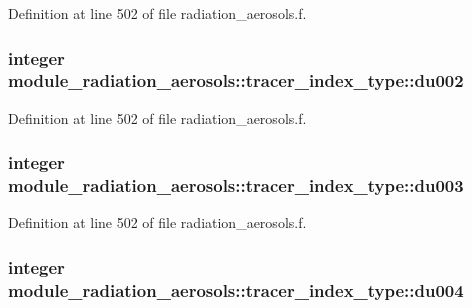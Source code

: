 Definition at line 502 of file radiation\+\_\+aerosols.\+f.

\subsubsection[{\texorpdfstring{du002}{du002}}]{\setlength{\rightskip}{0pt plus 5cm}integer module\+\_\+radiation\+\_\+aerosols\+::tracer\+\_\+index\+\_\+type\+::du002\hspace{0.3cm}{\ttfamily [private]}}\hypertarget{group__module__radiation__aerosols_gab68920703fa2cda7cbc42cb568a2ed56}{}\label{group__module__radiation__aerosols_gab68920703fa2cda7cbc42cb568a2ed56}


Definition at line 502 of file radiation\+\_\+aerosols.\+f.

\subsubsection[{\texorpdfstring{du003}{du003}}]{\setlength{\rightskip}{0pt plus 5cm}integer module\+\_\+radiation\+\_\+aerosols\+::tracer\+\_\+index\+\_\+type\+::du003\hspace{0.3cm}{\ttfamily [private]}}\hypertarget{group__module__radiation__aerosols_ga9b2422518e2c8aaba9f0b64bd0c4676a}{}\label{group__module__radiation__aerosols_ga9b2422518e2c8aaba9f0b64bd0c4676a}


Definition at line 502 of file radiation\+\_\+aerosols.\+f.

\subsubsection[{\texorpdfstring{du004}{du004}}]{\setlength{\rightskip}{0pt plus 5cm}integer module\+\_\+radiation\+\_\+aerosols\+::tracer\+\_\+index\+\_\+type\+::du004\hspace{0.3cm}{\ttfamily [private]}}\hypertarget{group__module__radiation__aerosols_ga69658f70ffccecfae1751c227ec1b14c}{}\label{group__module__radiation__aerosols_ga69658f70ffccecfae1751c227ec1b14c}



